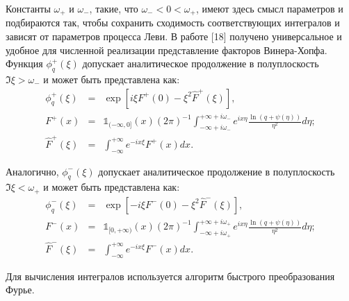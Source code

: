 \documentclass[draft, 12pt]{article}
\begin{document}
Константы $\omega_+$ и $\omega_-$, такие, что $\omega_-<0<\omega_+$, имеют здесь смысл параметров и подбираются так, чтобы сохранить сходимость соответствующих интегралов и зависят от параметров процесса Леви.  В работе [18] получено универсальное и удобное для численной реализации представление факторов Винера-Хопфа. Функция $\phi^+_q(\xi)$ допускает аналитическое продолжение в полуплоскость $\Im \xi>\omega_-$ и может быть представлена как:
\begin{eqnarray*}
	\phi^+_q(\xi)&=&\exp\left[i\xi F^+(0)-\xi^2\hat{F}^+(\xi)\right],\\ 
	F^+(x)&=&\mathds{1}_{(-\infty,0]}(x)(2\pi)^{-1}
	\int_{-\infty+i\omega_-}^{+\infty+i\omega_-}e^{ix\eta}\frac{\ln(q+\psi(\eta))}
	{\eta^2}d\eta;
	\\
	\hat{F}^+(\xi)&=&\int_{-\infty}^{+\infty}e^{-ix\xi}F^+(x)dx.
\end{eqnarray*}

Аналогично, $\phi^-_q(\xi)$ допускает аналитическое продолжение в полуплоскость $\Im \xi<\omega_+$ и может быть представлена как:
\begin{eqnarray*}
	\phi^-_q(\xi)&=&\exp\left[-i\xi F^-(0)-\xi^2\hat{F}^-(\xi)\right],\\
	F^-(x)&=&\mathds{1}_{[0,+\infty)}(x)(2\pi)^{-1}
	\int_{-\infty+i\omega_+}^{+\infty+i\omega_+}e^{ix\eta}\frac{\ln(q+\psi(\eta))}
	{\eta^2}d\eta;\\
	 \hat{F}^-(\xi)&=&\int_{-\infty}^{+\infty}e^{-ix\xi}F^-(x)dx.
\end{eqnarray*}

Для вычисления интегралов используется алгоритм быстрого преобразования Фурье.
\end{document}
